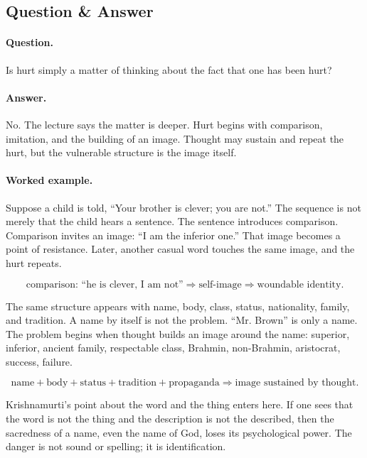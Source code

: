 \subsection{Question \& Answer}

\paragraph{Question.}
Is hurt simply a matter of thinking about the fact that one has been hurt?

\paragraph{Answer.}
No. The lecture says the matter is deeper. Hurt begins with comparison, imitation, and the building of an image. Thought may sustain and repeat the hurt, but the vulnerable structure is the image itself.

\paragraph{Worked example.}
Suppose a child is told, ``Your brother is clever; you are not.'' The sequence is not merely that the child hears a sentence. The sentence introduces comparison. Comparison invites an image: ``I am the inferior one.'' That image becomes a point of resistance. Later, another casual word touches the same image, and the hurt repeats.

\begin{equation}
\text{comparison: ``he is clever, I am not''}
\Rightarrow
\text{self-image}
\Rightarrow
\text{woundable identity}.
\end{equation}

The same structure appears with name, body, class, status, nationality, family, and tradition. A name by itself is not the problem. ``Mr. Brown'' is only a name. The problem begins when thought builds an image around the name: superior, inferior, ancient family, respectable class, Brahmin, non-Brahmin, aristocrat, success, failure.

\begin{equation}
\text{name}+\text{body}+\text{status}+\text{tradition}+\text{propaganda}
\Rightarrow
\text{image sustained by thought}.
\end{equation}

Krishnamurti's point about the word and the thing enters here. If one sees that the word is not the thing and the description is not the described, then the sacredness of a name, even the name of God, loses its psychological power. The danger is not sound or spelling; it is identification.

